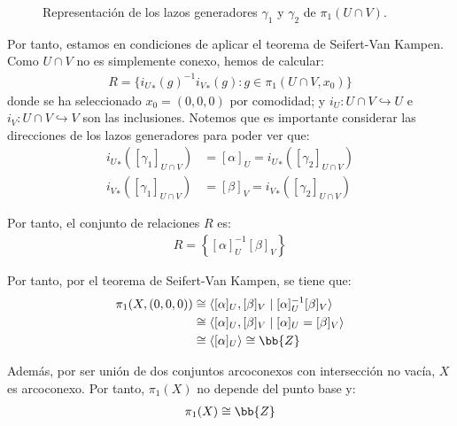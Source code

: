 \documentclass[12pt]{article}
\begin{document}
\begin{ejercicio}
\begin{itemize}
\begin{figure}[ht]
                \caption{Representación de los lazos generadores $\gamma_1$ y $\gamma_2$ de $\pi_1(U \cap V)$.}
                \label{fig:generadores_UcapV}
            \end{figure}
        \end{itemize}

        Por tanto, estamos en condiciones de aplicar el teorema de Seifert-Van Kampen. Como $U\cap V$ no es simplemente conexo, hemos de calcular:
        \begin{align*}
            R = \{{i_U}_*(g)^{-1} {i_V}_*(g) : g \in \pi_1(U\cap V, x_0)\}
        \end{align*}
        donde se ha seleccionado $x_0=(0,0,0)$ por comodidad; y $i_U:U\cap V\hookrightarrow U$ e $i_V:U\cap V\hookrightarrow V$ son las inclusiones. Notemos que es importante considerar las direcciones de los lazos generadores para poder ver que:
        \begin{align*}
            {i_U}_*\left([\gamma_1]_{U\cap V}\right) &= [\alpha]_{U} = {i_U}_*\left([\gamma_2]_{U\cap V}\right)\\
            {i_V}_*\left([\gamma_1]_{U\cap V}\right) &= [\beta]_{V} = {i_V}_*\left([\gamma_2]_{U\cap V}\right)
        \end{align*}

        Por tanto, el conjunto de relaciones $R$ es:
        \begin{align*}
            R = \left\{[\alpha]_{U}^{-1} [\beta]_{V}\right\}
        \end{align*}

        Por tanto, por el teorema de Seifert-Van Kampen, se tiene que:
        \begin{align*}
            \pi_1(X, (0,0,0)) &\cong \langle [\alpha]_{U}, [\beta]_{V} \mid [\alpha]_{U}^{-1} [\beta]_{V} \rangle\\
            &\cong \langle [\alpha]_{U}, [\beta]_{V} \mid [\alpha]_{U} = [\beta]_{V} \rangle\\
            &\cong \langle [\alpha]_{U} \rangle
            \cong \bb{Z}
        \end{align*}

        Además, por ser unión de dos conjuntos arcoconexos con intersección no vacía, $X$ es arcoconexo. Por tanto, $\pi_1(X)$ no depende del punto base y:
        \begin{align*}
            \pi_1(X) \cong \bb{Z}
        \end{align*}
    \end{ejercicio}


    
\end{document}
